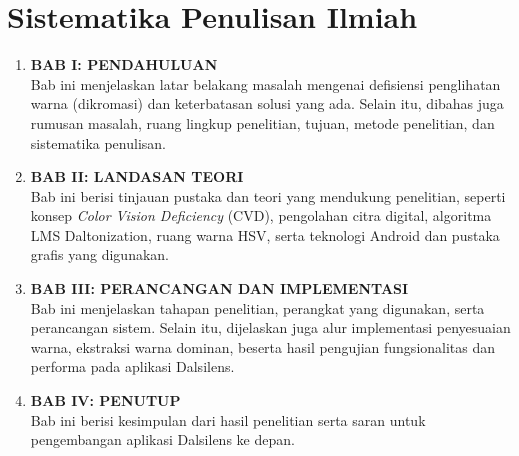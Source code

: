 %


\section{Sistematika Penulisan Ilmiah}\label{sec:sistematika-penulisan-ilmiah}

\begin{enumerate}
  \item \textbf{BAB I: PENDAHULUAN}\\
  Bab ini menjelaskan latar belakang masalah mengenai defisiensi penglihatan warna
  (dikromasi) dan keterbatasan solusi yang ada.
  Selain itu, dibahas juga rumusan masalah, ruang lingkup penelitian, tujuan, metode penelitian, dan sistematika penulisan.

  \item \textbf{BAB II: LANDASAN TEORI}\\
  Bab ini berisi tinjauan pustaka dan teori yang mendukung penelitian, seperti konsep
  \textit{Color Vision Deficiency} (CVD), pengolahan citra digital, algoritma LMS Daltonization,
  ruang warna HSV, serta teknologi Android dan pustaka grafis yang digunakan.

  \item \textbf{BAB III: PERANCANGAN DAN IMPLEMENTASI}\\
  Bab ini menjelaskan tahapan penelitian, perangkat yang digunakan, serta perancangan sistem.
  Selain itu, dijelaskan juga alur implementasi penyesuaian warna, ekstraksi warna dominan,
  beserta hasil pengujian fungsionalitas dan performa pada aplikasi Dalsilens.

  \item \textbf{BAB IV: PENUTUP}\\
  Bab ini berisi kesimpulan dari hasil penelitian serta saran untuk pengembangan
  aplikasi Dalsilens ke depan.
\end{enumerate}



